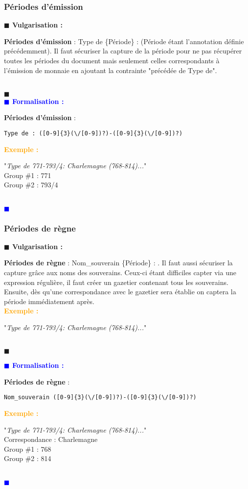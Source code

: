 \documentclass[a4paper, 11pt]{article}
\newenvironment{vulgarisation}
    {
    \textbf{\textcolor{dark-blue}{$\blacksquare$  Vulgarisation : \\}}

    }
    {
    ~\\\textcolor{dark-blue}{$\blacksquare$}\\
    }
\newenvironment{formalisation}
    {
    \textbf{\textcolor{blue}{$\blacksquare$  Formalisation : \\}}
    }
    {
    ~\\\textcolor{blue}{$\blacksquare$}\\
    }
\newenvironment{exemple}
    {
    \textbf{\textcolor{orange}{
    Exemple : \\}}
    }
    {\\
    }
\begin{document}
\subsubsection{Périodes d'émission}
\begin{vulgarisation}
	\textbf{Périodes d'émission} : \og Type de \{Période\} : \fg{} (Période étant l'annotation définie précédemment).
	Il faut sécuriser la capture de la période pour ne pas récupérer toutes les périodes du document mais seulement celles correspondants à l’émission de monnaie en ajoutant la contrainte "précédée de Type de".
\end{vulgarisation}
\begin{formalisation}
	\textbf{Périodes d'émission} : 
	\begin{verbatim}
Type de : ([0-9]{3}(\/[0-9])?)-([0-9]{3}(\/[0-9])?)
	\end{verbatim}
	\begin{exemple}
		"\emph{Type de 771-793/4: Charlemagne (768-814)...}" \\
		Group \#1 : 771 \\
		Group \#2 : 793/4
	\end{exemple}
\end{formalisation}

\subsubsection{Périodes de règne}
\begin{vulgarisation}
	\textbf{Périodes de règne} : \og Nom\_souverain \{Période\} : \fg{}. Il faut aussi sécuriser la capture grâce aux noms des souverains. Ceux-ci étant difficiles capter via une expression régulière, il faut créer un gazetier contenant tous les souverains. Ensuite, dès qu'une correspondance avec le gazetier sera établie on captera la période immédiatement après.\\
	\begin{exemple}
		"\emph{Type de 771-793/4: Charlemagne (768-814)...}" 
	\end{exemple}
\end{vulgarisation}

\begin{formalisation}
	\textbf{Périodes de règne} : 
	\begin{verbatim}
Nom_souverain ([0-9]{3}(\/[0-9])?)-([0-9]{3}(\/[0-9])?)
	\end{verbatim}
	\begin{exemple}
		"\emph{Type de 771-793/4: Charlemagne (768-814)...}" \\
		Correspondance : Charlemagne \\
		Group \#1 : 768 \\
		Group \#2 : 814
	\end{exemple}
\end{formalisation}
\end{document}
